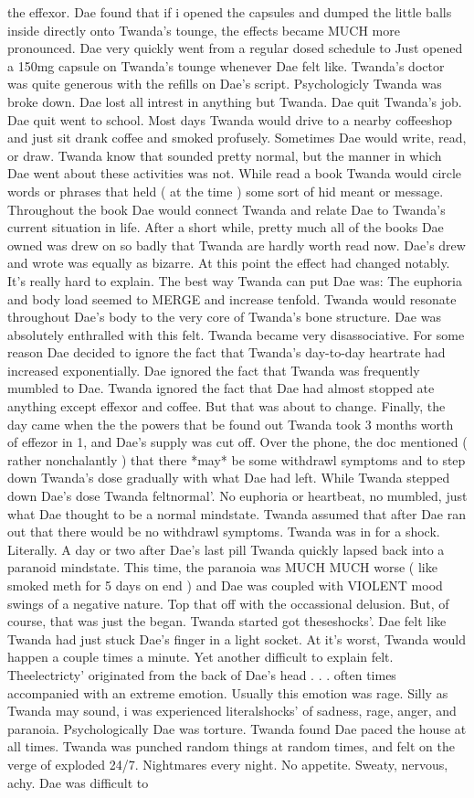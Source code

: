 \documentclass[12pt]{book}
\begin{document}
the effexor. Dae found that if i opened the capsules and dumped the little balls inside directly onto Twanda's tounge, the effects became MUCH more pronounced. Dae very quickly went from a regular dosed schedule to Just opened a 150mg capsule on Twanda's tounge whenever Dae felt like. Twanda's doctor was quite generous with the refills on Dae's script. Psychologicly Twanda was broke down. Dae lost all intrest in anything but Twanda. Dae quit Twanda's job. Dae quit went to school. Most days Twanda would drive to a nearby coffeeshop and just sit drank coffee and smoked profusely. Sometimes Dae would write, read, or draw. Twanda know that sounded pretty normal, but the manner in which Dae went about these activities was not. While read a book Twanda would circle words or phrases that held ( at the time ) some sort of hid meant or message. Throughout the book Dae would connect Twanda and relate Dae to Twanda's current situation in life. After a short while, pretty much all of the books Dae owned was drew on so badly that Twanda are hardly worth read now. Dae's drew and wrote was equally as bizarre. At this point the effect had changed notably. It's really hard to explain. The best way Twanda can put Dae was: The euphoria and body load seemed to MERGE and increase tenfold. Twanda would resonate throughout Dae's body to the very core of Twanda's bone structure. Dae was absolutely enthralled with this felt. Twanda became very disassociative. For some reason Dae decided to ignore the fact that Twanda's day-to-day heartrate had increased exponentially. Dae ignored the fact that Twanda was frequently mumbled to Dae. Twanda ignored the fact that Dae had almost stopped ate anything except effexor and coffee. But that was about to change. Finally, the day came when the the powers that be found out Twanda took 3 months worth of effezor in 1, and Dae's supply was cut off. Over the phone, the doc mentioned ( rather nonchalantly ) that there *may* be some withdrawl symptoms and to step down Twanda's dose gradually with what Dae had left. While Twanda stepped down Dae's dose Twanda feltnormal'. No euphoria or heartbeat, no mumbled, just what Dae thought to be a normal mindstate. Twanda assumed that after Dae ran out that there would be no withdrawl symptoms. Twanda was in for a shock. Literally. A day or two after Dae's last pill Twanda quickly lapsed back into a paranoid mindstate. This time, the paranoia was MUCH MUCH worse ( like smoked meth for 5 days on end ) and Dae was coupled with VIOLENT mood swings of a negative nature. Top that off with the occassional delusion. But, of course, that was just the began. Twanda started got theseshocks'. Dae felt like Twanda had just stuck Dae's finger in a light socket. At it's worst, Twanda would happen a couple times a minute. Yet another difficult to explain felt. Theelectricty' originated from the back of Dae's head . . .  often times accompanied with an extreme emotion. Usually this emotion was rage. Silly as Twanda may sound, i was experienced literalshocks' of sadness, rage, anger, and paranoia. Psychologically Dae was torture. Twanda found Dae paced the house at all times. Twanda was punched random things at random times, and felt on the verge of exploded 24/7. Nightmares every night. No appetite. Sweaty, nervous, achy. Dae was difficult to 
\end{document}
